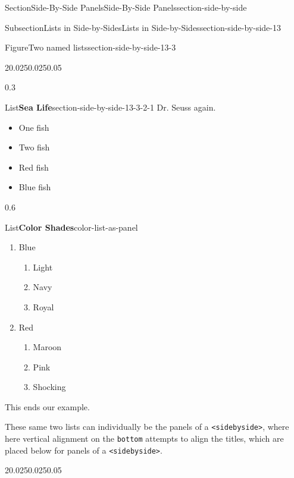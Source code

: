 \documentclass[twoside,10pt,]{article}
\newcommand{\mono}[1]{\texttt{#1}}
\numberwithin{equation}{section}
\begin{document}
\begin{sectionptx}{Section}{Side-By-Side Panels}{}{Side-By-Side Panels}{}{}{section-side-by-side}
\begin{subsectionptx}{Subsection}{Lists in Side-by-Sides}{}{Lists in Side-by-Sides}{}{}{section-side-by-side-13}
\begin{figureptx}{Figure}{Two named lists}{section-side-by-side-13-3}{}%
\begin{sidebyside}{2}{0.025}{0.025}{0.05}%
\begin{sbspanel}{0.3}%
\begin{sublistptx}{List}{\textbf{Sea Life}}{section-side-by-side-13-3-2-1}{}%
Dr. Seuss again.%
%
\begin{itemize}[label=\textbullet]
\item{}One fish%
\item{}Two fish\protect\footnotemark{}%
\item{}Red fish%
\item{}Blue fish%
\end{itemize}
\tcblower
\end{sublistptx}%
\end{sbspanel}%
\begin{sbspanel}{0.6}%
\begin{sublistptx}{List}{\textbf{Color Shades}}{color-list-as-panel}{}%
%
%
\begin{enumerate}
\item{}Blue\protect\footnotemark{}%
\begin{enumerate}
\item{}Light%
\item{}Navy%
\item{}Royal%
\end{enumerate}
%
\item{}Red%
\begin{enumerate}
\item{}Maroon%
\item{}Pink%
\item{}Shocking%
\end{enumerate}
%
\end{enumerate}
This ends our example.%
\tcblower
\end{sublistptx}%
\end{sbspanel}%
\end{sidebyside}%
\tcblower
\end{figureptx}%
%
%
These same two lists can individually be the panels of a \mono{<sidebyside>}, where here vertical alignment on the \mono{bottom} attempts to align the titles, which are placed below for panels of a \mono{<sidebyside>}.%
\begin{sidebyside}{2}{0.025}{0.025}{0.05}%

\end{sidebyside}
\end{subsectionptx}
\end{sectionptx}
\end{document}
